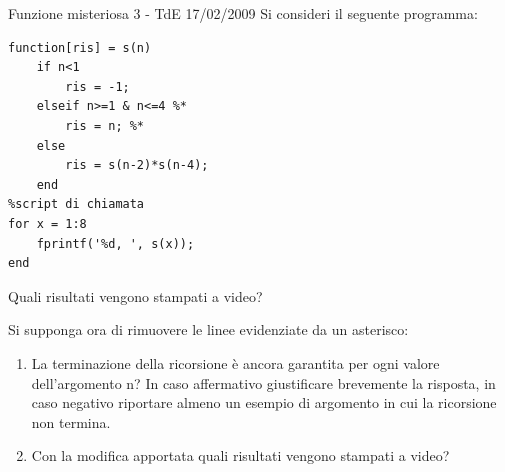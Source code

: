 \documentclass[format=169,]{beamer}
\begin{document}
\begin{frame}{Funzione misteriosa 3 - TdE 17/02/2009}
	Si consideri il seguente programma:
\begin{lstlisting}[style=matlab, basicstyle=\small]
function[ris] = s(n)
    if n<1
        ris = -1;
    elseif n>=1 & n<=4 %*
        ris = n; %*
    else
        ris = s(n-2)*s(n-4);
    end
%script di chiamata
for x = 1:8
    fprintf('%d, ', s(x));    
end    
\end{lstlisting}
	
	Quali risultati vengono stampati a video?
	
	Si supponga ora di rimuovere le linee evidenziate da un asterisco:
	\begin{enumerate}
		\item La terminazione della ricorsione è ancora garantita per ogni valore
		dell’argomento n? In caso affermativo giustificare brevemente la risposta,
		in caso negativo riportare almeno un esempio di argomento in cui la
		ricorsione non termina.
		
		\item Con la modifica apportata quali risultati vengono stampati a video?
	\end{enumerate}
\end{frame}
\end{document}
